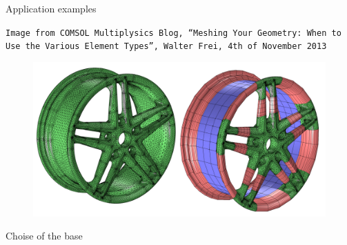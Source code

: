 \begin{frame}{Application examples}
\begin{minipage}{0.425\textwidth}
      \tiny{\texttt{Image from COMSOL Multiplysics Blog, ``Meshing Your Geometry: When to Use the Various Element Types'', Walter Frei, 4th of November 2013}}
   \end{minipage}
   \hfill
   \begin{minipage}{0.5\textwidth}
      \begin{figure}[H]
         \raggedleft
         \includegraphics[width=\textwidth]{Immagini/mesh-application-2.png}
      \end{figure}
   \end{minipage}
\end{frame}

\begin{frame}{Choise of the base}
   
\end{frame}

